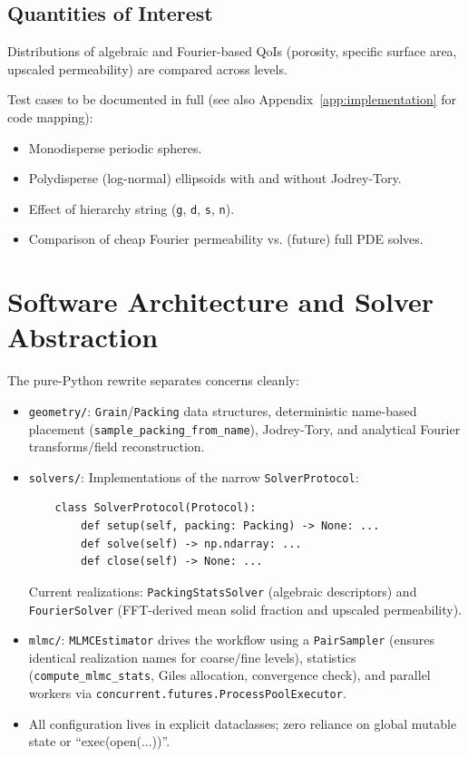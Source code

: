\documentclass[preprint,12pt]{elsarticle}
\begin{document}
\subsection{Quantities of Interest}
Distributions of algebraic and Fourier-based QoIs (porosity, specific surface area, upscaled permeability) are compared across levels.

Test cases to be documented in full (see also Appendix~\ref{app:implementation} for code mapping):
\begin{itemize}
  \item Monodisperse periodic spheres.
  \item Polydisperse (log-normal) ellipsoids with and without Jodrey-Tory.
  \item Effect of hierarchy string (\texttt{g}, \texttt{d}, \texttt{s}, \texttt{n}).
  \item Comparison of cheap Fourier permeability vs. (future) full PDE solves.
\end{itemize}

\section{Software Architecture and Solver Abstraction}
\label{sec:architecture}

The pure-Python rewrite separates concerns cleanly:

\begin{itemize}
    \item \texttt{geometry/}: \texttt{Grain}/\texttt{Packing} data structures, deterministic name-based placement (\texttt{sample\_packing\_from\_name}), Jodrey-Tory, and analytical Fourier transforms/field reconstruction.
    \item \texttt{solvers/}: Implementations of the narrow \texttt{SolverProtocol}:
\begin{verbatim}
    class SolverProtocol(Protocol):
        def setup(self, packing: Packing) -> None: ...
        def solve(self) -> np.ndarray: ...
        def close(self) -> None: ...
\end{verbatim}
    Current realizations: \texttt{PackingStatsSolver} (algebraic descriptors) and \texttt{FourierSolver} (FFT-derived mean solid fraction and upscaled permeability).
    \item \texttt{mlmc/}: \texttt{MLMCEstimator} drives the workflow using a \texttt{PairSampler} (ensures identical realization names for coarse/fine levels), statistics (\texttt{compute\_mlmc\_stats}, Giles allocation, convergence check), and parallel workers via \texttt{concurrent.futures.ProcessPoolExecutor}.
    \item All configuration lives in explicit dataclasses; zero reliance on global mutable state or ``exec(open(...))''.
\end{itemize}
\end{document}
